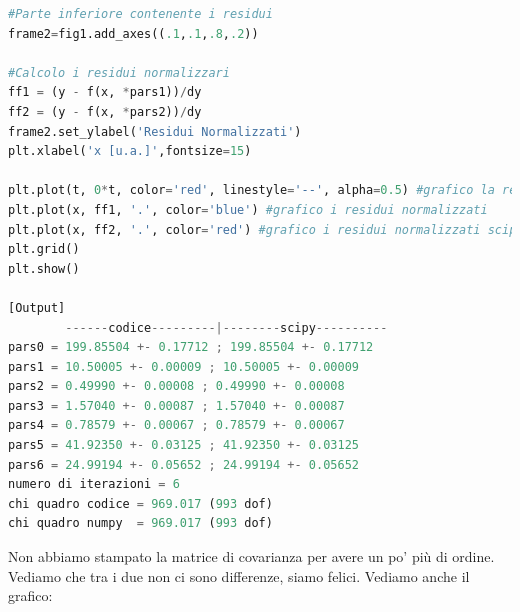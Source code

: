 \documentclass[10pt,a4paper]{article}
\begin{document}
\begin{lstlisting}[language=Python]
#Parte inferiore contenente i residui
frame2=fig1.add_axes((.1,.1,.8,.2))

#Calcolo i residui normalizzari
ff1 = (y - f(x, *pars1))/dy
ff2 = (y - f(x, *pars2))/dy
frame2.set_ylabel('Residui Normalizzati')
plt.xlabel('x [u.a.]',fontsize=15)

plt.plot(t, 0*t, color='red', linestyle='--', alpha=0.5) #grafico la retta costantemente zero
plt.plot(x, ff1, '.', color='blue') #grafico i residui normalizzati
plt.plot(x, ff2, '.', color='red') #grafico i residui normalizzati scipy
plt.grid()
plt.show()

[Output]
        ------codice---------|--------scipy----------
pars0 = 199.85504 +- 0.17712 ; 199.85504 +- 0.17712
pars1 = 10.50005 +- 0.00009 ; 10.50005 +- 0.00009
pars2 = 0.49990 +- 0.00008 ; 0.49990 +- 0.00008
pars3 = 1.57040 +- 0.00087 ; 1.57040 +- 0.00087
pars4 = 0.78579 +- 0.00067 ; 0.78579 +- 0.00067
pars5 = 41.92350 +- 0.03125 ; 41.92350 +- 0.03125
pars6 = 24.99194 +- 0.05652 ; 24.99194 +- 0.05652
numero di iterazioni = 6
chi quadro codice = 969.017 (993 dof)
chi quadro numpy  = 969.017 (993 dof)
\end{lstlisting}
Non abbiamo stampato la matrice di covarianza per avere un po' più di ordine. Vediamo che tra i due non ci sono differenze, siamo felici. Vediamo anche il grafico:


\begin{center}
\end{center}


\newpage
\end{document}
